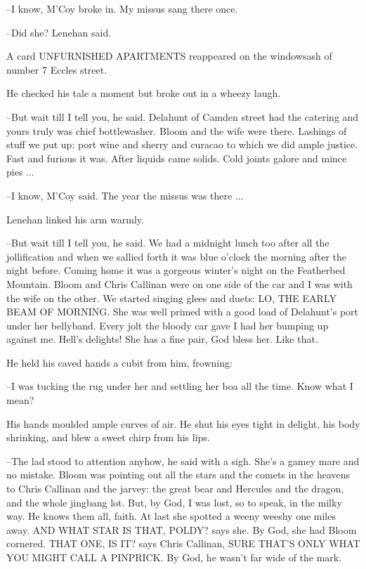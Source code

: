 --I know,
M'Coy broke in.
My missus sang there once.

--Did she?
Lenehan said.

A card UNFURNISHED APARTMENTS reappeared
on the windowsash of
number 7 Eccles street.

He checked his tale a moment
but broke out in a wheezy laugh.

--But wait till I tell you, he said.
Delahunt of Camden street had the
catering
and yours truly was chief bottlewasher.
Bloom and the wife were
there.
Lashings of stuff we put up:
port wine and sherry and curacao to
which we did ample justice.
Fast and furious it was.
After liquids came
solids.
Cold joints galore and mince pies ...

--I know, M'Coy said.
The year the missus was there ...

Lenehan linked his arm warmly.

--But wait till I tell you,
he said.
We had a midnight lunch too after all
the jollification
and when we sallied forth
it was blue o'clock the
morning after the night before.
Coming home it was a gorgeous winter's
night on the Featherbed Mountain.
Bloom and Chris Callinan were on one
side of the car
and I was with the wife on the other.
We started singing
glees and duets:
LO, THE EARLY BEAM OF MORNING.
She was well primed with a
good load of Delahunt's port under her bellyband.
Every jolt the bloody
car gave
I had her bumping up against me.
Hell's delights!
She has a fine
pair, God bless her.
Like that.


He held his caved hands a cubit from him,
frowning:

--I was tucking the rug under her
and settling her boa all the time.
Know
what I mean?

His hands moulded ample curves of air.
He shut his eyes tight in
delight,
his body shrinking,
and blew a sweet chirp from his lips.

--The lad stood to attention anyhow,
he said with a sigh.
She's a gamey
mare and no mistake.
Bloom was pointing out all the stars and the comets
in the heavens
to Chris Callinan and the jarvey:
the great bear and
Hercules and the dragon,
and the whole jingbang lot.
But, by God, I was
lost,
so to speak,
in the milky way.
He knows them all, faith.
At last she
spotted a weeny weeshy one miles away.
AND WHAT STAR IS THAT, POLDY?
says
she.
By God, she had Bloom cornered.
THAT ONE, IS IT?
says Chris Callinan,
SURE THAT'S ONLY WHAT YOU MIGHT CALL A PINPRICK.
By God, he wasn't far
wide of the mark.

